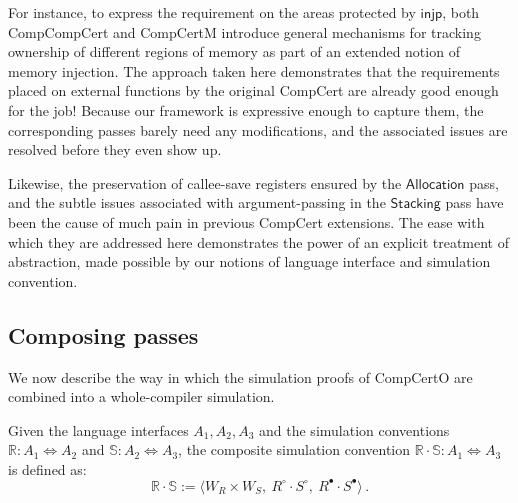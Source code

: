 \documentclass[acmsmall,authordraft]{acmart}
\newcommand{\kw}[1]{\ensuremath{ \mathsf{#1} }}
\newcommand{\que}{\circ}
\newcommand{\ans}{\bullet}
\begin{document}
For instance,
to express the requirement on
the areas protected by \kw{injp},
both CompCompCert and CompCertM
introduce general mechanisms for tracking ownership of
different regions of memory
as part of an extended notion of memory injection.
The approach taken here demonstrates that
the requirements placed on external functions
by the original CompCert
are already good enough for the job!
Because our framework is expressive enough to capture them,
the corresponding passes barely need any modifications,
and the associated issues are resolved before they even show up.

Likewise, the preservation of callee-save registers
ensured by the \kw{Allocation} pass,
and the subtle issues associated with argument-passing
in the \kw{Stacking} pass
have been the cause of much pain
in previous CompCert extensions.
The ease with which they are addressed here
demonstrates the power of
an explicit treatment of abstraction,
made possible
by our notions of language interface and simulation convention.

%


\subsection{Composing passes} \label{sec:comppass} %

We now describe the way in which
the simulation proofs of CompCertO
are combined into
a whole-compiler simulation.

\begin{definition} %
Given the language interfaces $A_1, A_2, A_3$
and the simulation conventions
$\mathbb{R} : A_1 \Leftrightarrow A_2$ and
$\mathbb{S} : A_2 \Leftrightarrow A_3$,
the composite simulation convention
$\mathbb{R} \cdot \mathbb{S} : A_1 \Leftrightarrow A_3$ is defined as:
\[
    \mathbb{R} \cdot \mathbb{S} :=
      \langle
        W_R \times W_S, \:
        R^\que \cdot S^\que, \:
        R^\ans \cdot S^\ans
      \rangle \,.
\]
\end{definition}
\end{document}
